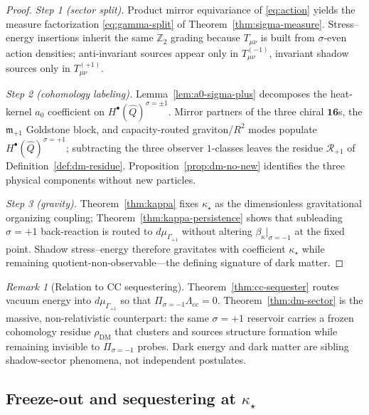\documentclass[aps,prd,onecolumn,amsmath,amssymb,nofootinbib,11pt]{revtex4-2}
\numberwithin{equation}{section}
\theoremstyle{plain}
\theoremstyle{definition}
\theoremstyle{remark}
\newtheorem{remark}[theorem]{Remark}
\begin{document}
\begin{proof}
\emph{Step 1 (sector split).}
Product mirror equivariance of \eqref{eq:action} yields the measure
factorization \eqref{eq:gamma-split} of Theorem~\ref{thm:sigma-measure}.
Stress--energy insertions inherit the same $\mathbb{Z}_2$ grading because
$T_{\mu\nu}$ is built from $\sigma$-even action densities; anti-invariant
sources appear only in $T_{\mu\nu}^{(-1)}$, invariant shadow sources only in
$T_{\mu\nu}^{(+1)}$.

\emph{Step 2 (cohomology labeling).}
Lemma~\ref{lem:a0-sigma-plus} decomposes the heat-kernel $a_0$ coefficient on
$H^\bullet(\hat Q)^{\sigma=\pm1}$. Mirror partners of the three chiral
$\mathbf{16}$s, the $\mathfrak{m}_{+1}$ Goldstone block, and
capacity-routed graviton/$R^2$ modes populate $H^\bullet(\hat Q)^{\sigma=+1}$;
subtracting the three observer $1$-classes leaves the residue
$\mathcal{R}_{+1}$ of Definition~\ref{def:dm-residue}. Proposition~\ref{prop:dm-no-new}
identifies the three physical components without new particles.

\emph{Step 3 (gravity).}
Theorem~\ref{thm:kappa} fixes $\kappa_\star$ as the dimensionless gravitational
organizing coupling; Theorem~\ref{thm:kappa-persistence} shows that
subleading $\sigma=+1$ back-reaction is routed to $d\mu_{\Gamma_{+1}}$ without
altering $\beta_\kappa|_{\sigma=-1}$ at the fixed point. Shadow stress--energy
therefore gravitates with coefficient $\kappa_\star$ while remaining
quotient-non-observable---the defining signature of dark matter.
\end{proof}

\begin{remark}[Relation to CC sequestering]
Theorem~\ref{thm:cc-sequester} routes vacuum energy into
$d\mu_{\Gamma_{+1}}$ so that $\Pi_{\sigma=-1}\Lambda_{\mathrm{cc}}=0$.
Theorem~\ref{thm:dm-sector} is the massive, non-relativistic counterpart:
the same $\sigma=+1$ reservoir carries a frozen cohomology residue
$\rho_{\mathrm{DM}}$ that clusters and sources structure formation while
remaining invisible to $\Pi_{\sigma=-1}$ probes. Dark energy and dark matter
are sibling shadow-sector phenomena, not independent postulates.
\end{remark}

\subsection{Freeze-out and sequestering at $\kappa_\star$}
\label{sec:dark-sector:abundance}
\end{document}
